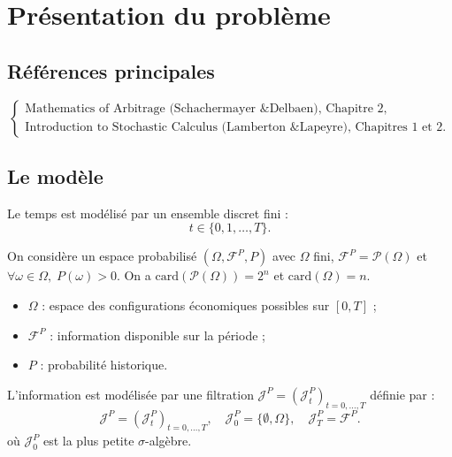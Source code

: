 \chapter{Présentation du problème}

\section*{Références principales}
\[
\begin{cases}
\text{Mathematics of Arbitrage (Schachermayer \& Delbaen), Chapitre 2},\\[3pt]
\text{Introduction to Stochastic Calculus (Lamberton \& Lapeyre), Chapitres 1 et 2.}
\end{cases}
\]

\section{Le modèle}

\begin{definition}
Le temps est modélisé par un ensemble discret fini :
\begin{equation}
t \in \{0, 1, \ldots, T\}.
\end{equation}
\end{definition}

\begin{definition}
On considère un espace probabilisé $(\Omega, \mathcal{F}^{P}, P)$ avec $\Omega$ fini, $\mathcal{F}^{P} = \mathcal{P}(\Omega)$ et $\forall \omega \in \Omega,\; P(\omega)>0$. On a $\text{card}(\mathcal{P}(\Omega)) = 2^n$ et $\text{card}(\Omega) = n$.
\end{definition}

\medskip
\begin{tcolorbox}[title=Interprétation intuitive, colback=yellow!5!white, colframe=yellow!50!black]
\begin{itemize}
    \item $\Omega$ : espace des configurations économiques possibles sur $[0,T]$ ;
    \item $\mathcal{F}^{P}$ : information disponible sur la période ;
    \item $P$ : probabilité historique.
\end{itemize}
\end{tcolorbox}

\begin{definition}[Filtration]
L'information est modélisée par une filtration $\mathcal{J}^{P} = (\mathcal{J}^{P}_{t})_{t=0,\ldots,T}$ définie par :
\begin{equation}
\mathcal{J}^{P} = (\mathcal{J}^{P}_{t})_{t=0,\ldots,T}, \quad \mathcal{J}^{P}_{0}=\{\emptyset,\Omega\}, \quad \mathcal{J}^{P}_{T}=\mathcal{F}^{P}.
\end{equation}
où $\mathcal{J}^{P}_{0}$ est la plus petite $\sigma$-algèbre.
\end{definition}

